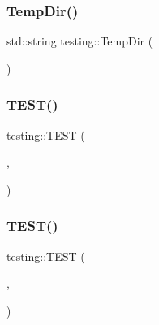 \mbox{\label{namespacetesting_aae1bbe7c3cc99bf56263d51d3982a52e}} 
\subsubsection{\texorpdfstring{TempDir()}{TempDir()}}
{\footnotesize\ttfamily std\+::string testing\+::\+Temp\+Dir (\begin{DoxyParamCaption}{ }\end{DoxyParamCaption})}

\mbox{\label{namespacetesting_af4187d1b48a2812f1335721ed8f30a99}} 
\subsubsection{\texorpdfstring{TEST()}{TEST()}\hspace{0.1cm}{\footnotesize\ttfamily [1/7]}}
{\footnotesize\ttfamily testing\+::\+T\+E\+ST (\begin{DoxyParamCaption}\item[{G\+Test\+Env\+Var\+Test}]{,  }\item[{Dummy}]{ }\end{DoxyParamCaption})}

\mbox{\label{namespacetesting_ae0cbea692840c88ab0b03285eb69ac97}} 
\subsubsection{\texorpdfstring{TEST()}{TEST()}\hspace{0.1cm}{\footnotesize\ttfamily [2/7]}}
{\footnotesize\ttfamily testing\+::\+T\+E\+ST (\begin{DoxyParamCaption}\item[{Successful\+Assertion\+Test}]{,  }\item[{\mbox{\hyperlink{_obj__test_2lib_2googletest-release-1_88_81_2googletest_2include_2gtest_2gtest_8h_a75adcdf89f69b0b615e395daafc315af}{S\+U\+C\+C\+E\+ED}}}]{ }\end{DoxyParamCaption})}

\mbox{\label{namespacetesting_af6c8f998f934372e5687d3998068e5e4}} 
